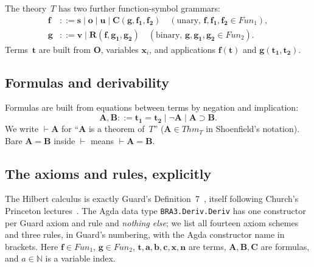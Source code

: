 \documentclass[11pt]{article}
\theoremstyle{plain}
\theoremstyle{definition}
\theoremstyle{remark}
\newcommand{\Fun}{\mathit{Fun}}
\newcommand{\Thmm}{\mathit{Thm}}
\begin{document}
The theory~$T$ has two further function-symbol grammars:
\begin{align*}
\mathbf{f}   &::= \mathbf{s} \mid \mathbf{o} \mid \mathbf{u} \mid \mathbf{C}(\mathbf{g}, \mathbf{f_1}, \mathbf{f_2}) \quad (\text{unary, } \mathbf{f}, \mathbf{f_1}, \mathbf{f_2} \in \Fun_1), \\
\mathbf{g}   &::= \mathbf{v} \mid \mathbf{R}(\mathbf{f}, \mathbf{g_1}, \mathbf{g_2}) \quad (\text{binary, } \mathbf{g}, \mathbf{g_1}, \mathbf{g_2} \in \Fun_2).
\end{align*}
Terms~$\mathbf{t}$ are built from $\mathbf{O}$, variables
$\mathbf{x}_i$, and applications $\mathbf{f}(\mathbf{t})$ and
$\mathbf{g}(\mathbf{t_1}, \mathbf{t_2})$.

\subsection{Formulas and derivability}

Formulas are built from equations between terms by negation and
implication:
\[
\mathbf{A}, \mathbf{B} ::= \mathbf{t_1} = \mathbf{t_2} \mid \neg \mathbf{A} \mid \mathbf{A} \supset \mathbf{B}.
\]
We write $\vdash \mathbf{A}$ for ``$\mathbf{A}$ is a theorem of~$T$''
($\mathbf{A} \in \Thmm_T$ in Shoenfield's notation).  Bare $\mathbf{A}
= \mathbf{B}$ inside $\vdash$ means $\vdash \mathbf{A} = \mathbf{B}$.

\subsection{The axioms and rules, explicitly}
\label{sec:axioms}

The Hilbert calculus is exactly Guard's Definition~7~\cite{Guard63},
itself following Church's Princeton lectures~\cite{Church}.  The Agda
data type \verb|BRA3.Deriv.Deriv| has one constructor per Guard axiom and
rule and \emph{nothing else}; we list all fourteen axiom schemes and
three rules, in Guard's numbering, with the Agda constructor name in
brackets.  Here $\mathbf{f} \in \Fun_1$, $\mathbf{g} \in \Fun_2$,
$\mathbf{t},\mathbf{a},\mathbf{b},\mathbf{c},\mathbf{x},\mathbf{n}$ are
terms, $\mathbf{A},\mathbf{B},\mathbf{C}$ are formulas, and $a \in
\mathbb{N}$ is a variable index.
\end{document}
